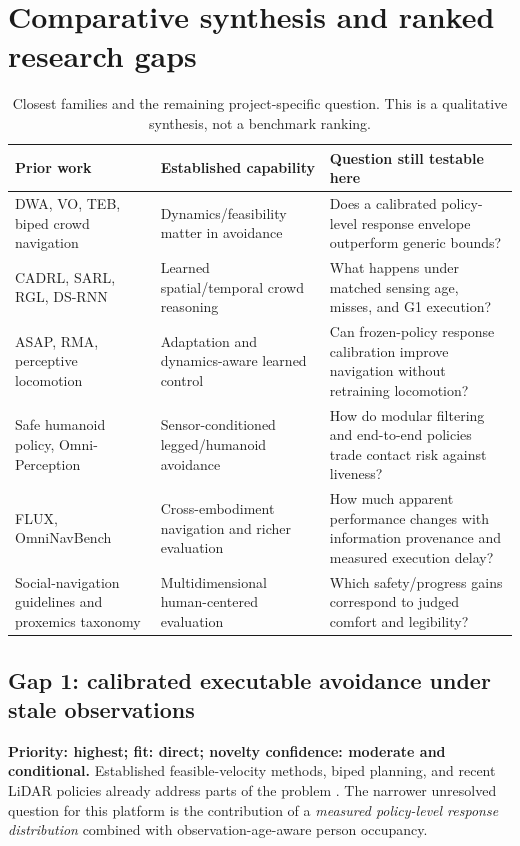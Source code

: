 \documentclass[11pt,a4paper]{article}
\begin{document}
\section{Comparative synthesis and ranked research gaps}
\label{sec:gaps}
\begin{table}[htbp]
\small
\caption{Closest families and the remaining project-specific question.
This is a qualitative synthesis, not a benchmark ranking.}
\begin{tabularx}{\textwidth}{P{0.23\textwidth}YY}
\toprule
Prior work & Established capability & Question still testable here \\
\midrule
DWA, VO, TEB, biped crowd navigation & Dynamics/feasibility matter in avoidance & Does a calibrated policy-level response envelope outperform generic bounds? \\
CADRL, SARL, RGL, DS-RNN & Learned spatial/temporal crowd reasoning & What happens under matched sensing age, misses, and G1 execution? \\
ASAP, RMA, perceptive locomotion & Adaptation and dynamics-aware learned control & Can frozen-policy response calibration improve navigation without retraining locomotion? \\
Safe humanoid policy, Omni-Perception & Sensor-conditioned legged/humanoid avoidance & How do modular filtering and end-to-end policies trade contact risk against liveness? \\
FLUX, OmniNavBench & Cross-embodiment navigation and richer evaluation & How much apparent performance changes with information provenance and measured execution delay? \\
Social-navigation guidelines and proxemics taxonomy & Multidimensional human-centered evaluation & Which safety/progress gains correspond to judged comfort and legibility? \\
\bottomrule
\end{tabularx}
\end{table}

\subsection{Gap 1: calibrated executable avoidance under stale observations}
\label{gap:response}
\textbf{Priority: highest; fit: direct; novelty confidence: moderate and
conditional.} Established feasible-velocity methods, biped planning, and
recent LiDAR policies already address parts of the problem
\citep{vo,dwa,biped2016,safehumanoid}. The narrower unresolved question for
this platform is the contribution of a \emph{measured policy-level response
distribution} combined with observation-age-aware person occupancy.
\end{document}
